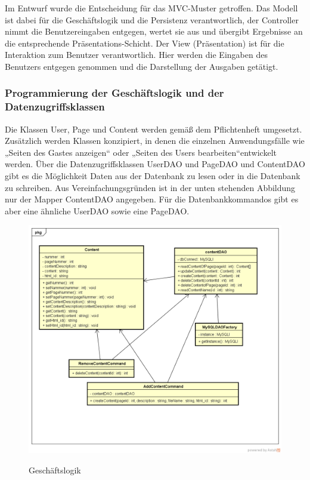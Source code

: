\documentclass[10.5pt]{scrarticle}
\begin{document}
Im Entwurf wurde die Entscheidung für das MVC-Muster getroffen. Das Modell ist dabei für die Geschäftslogik und die Persistenz verantwortlich, der Controller nimmt die Benutzereingaben entgegen, wertet sie aus und übergibt Ergebnisse an die entsprechende Präsentations-Schicht. Der View (Präsentation) ist für die Interaktion zum Benutzer verantwortlich. Hier werden die Eingaben des Benutzers entgegen genommen und die Darstellung der Ausgaben getätigt.

\subsubsection{Programmierung der Geschäftslogik und der Datenzugriffsklassen}

Die Klassen User, Page und Content werden gemäß dem Pflichtenheft umgesetzt. Zusätzlich werden Klassen konzipiert, in denen die einzelnen Anwendungsfälle wie „Seiten des Gastes anzeigen“ oder „Seiten des Users bearbeiten“entwickelt werden.
Über die Datenzugriffsklassen UserDAO und PageDAO und ContentDAO gibt es die Möglichkeit Daten aus der Datenbank zu lesen oder in die Datenbank zu schreiben. Aus Vereinfachungsgründen ist in der unten stehenden Abbildung nur der Mapper ContentDAO angegeben. Für die Datenbankkommandos gibt es aber eine ähnliche UserDAO sowie eine PageDAO.

\begin{figure}[h!]
\caption{Geschäftslogik}
\includegraphics[scale=0.52]{GeschäftsLogik1}
\label{fig:GeschäftsLogik}
\end{figure}
\end{document}

